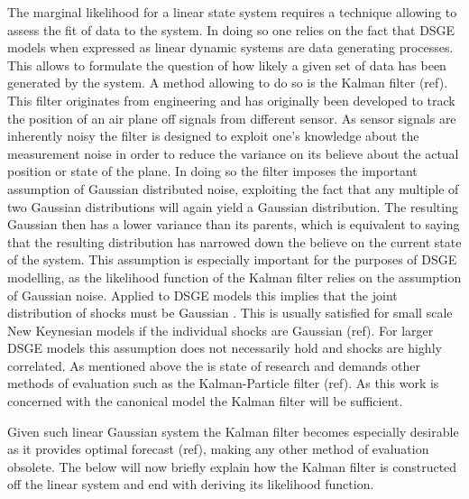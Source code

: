 \documentclass[12pt,a4paper,english]{article} %
\begin{document}
	The marginal likelihood for a linear state system requires a technique allowing to assess the fit of data to the system. In doing so one relies on the fact that DSGE models when expressed as linear dynamic systems are data generating processes. This allows to formulate the question of how likely a given set of data has been generated by the system. A method allowing to do so is the Kalman filter (ref). This filter originates from engineering and has originally been developed to track the position of an air plane off signals from different sensor. As sensor signals are inherently noisy the filter is designed to exploit one's knowledge about the measurement noise in order to reduce the variance on its believe about the actual position or state of the plane. In doing so the filter imposes the important assumption of Gaussian distributed noise, exploiting the fact that any multiple of two Gaussian distributions will again yield a Gaussian distribution. The resulting Gaussian then has a lower variance than its parents, which is equivalent to saying that the resulting distribution has narrowed down the believe on the current state of the system. This assumption is especially important for the purposes of DSGE modelling, as the likelihood function of the Kalman filter relies on the assumption of Gaussian noise. Applied to DSGE models this implies that the joint distribution of shocks must be Gaussian \cite{herbst_bayesian_2016}. 
	This is usually satisfied for small scale New Keynesian models if the individual shocks are Gaussian (ref). For larger DSGE models this assumption does not necessarily hold and shocks are highly correlated. As mentioned above the is state of research and demands other methods of evaluation such as the Kalman-Particle filter (ref). As this work is concerned with the canonical model the Kalman filter will be sufficient.
	
	Given such linear Gaussian system the Kalman filter becomes especially desirable as it provides optimal forecast (ref), making any other method of evaluation obsolete. The below will now briefly explain how the Kalman filter is constructed off the linear system and end with deriving its likelihood function.
	
\end{document}
